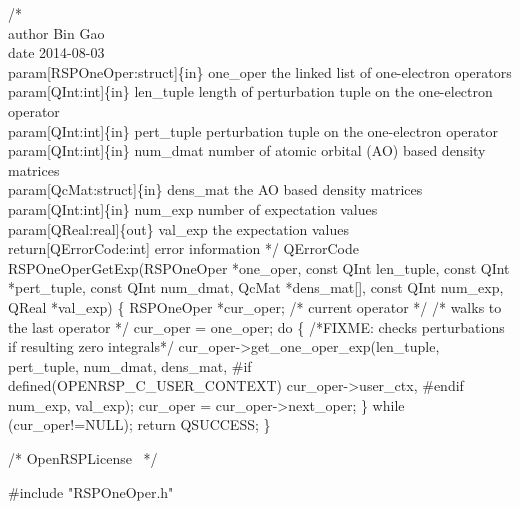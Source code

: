 /*%
    \\author Bin Gao
    \\date 2014-08-03
    \\param[RSPOneOper:struct]\{in\} one_oper the linked list of one-electron operators
    \\param[QInt:int]\{in\} len_tuple length of perturbation tuple on the one-electron operator
    \\param[QInt:int]\{in\} pert_tuple perturbation tuple on the one-electron operator
    \\param[QInt:int]\{in\} num_dmat number of atomic orbital (AO) based density matrices
    \\param[QcMat:struct]\{in\} dens_mat the AO based density matrices
    \\param[QInt:int]\{in\} num_exp number of expectation values
    \\param[QReal:real]\{out\} val_exp the expectation values
    \\return[QErrorCode:int] error information
*/
QErrorCode RSPOneOperGetExp(RSPOneOper *one_oper,
                            const QInt len_tuple,
                            const QInt *pert_tuple,
                            const QInt num_dmat,
                            QcMat *dens_mat[],
                            const QInt num_exp,
                            QReal *val_exp)
\{
    RSPOneOper *cur_oper;  /* current operator */
    /* walks to the last operator */
    cur_oper = one_oper;
    do \{
/*FIXME: checks perturbations if resulting zero integrals*/
        cur_oper->get_one_oper_exp(len_tuple,
                                   pert_tuple,
                                   num_dmat,
                                   dens_mat,
#if defined(OPENRSP_C_USER_CONTEXT)
                                   cur_oper->user_ctx,
#endif
                                   num_exp,
                                   val_exp);
        cur_oper = cur_oper->next_oper;
    \} while (cur_oper!=NULL);
    return QSUCCESS;
\}

\nwendcode{}\endmoddef
/*
  \LA{}OpenRSPLicense~{\nwtagstyle{}}\RA{}
*/

#include "RSPOneOper.h"

